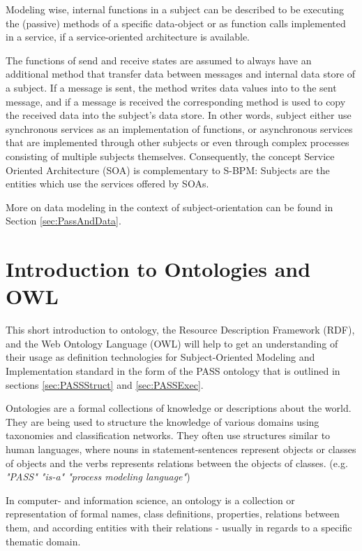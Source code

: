 Modeling wise, internal functions in a subject can be described to be executing the (passive) methods of a specific data-object or as function calls implemented in a service, if a service-oriented architecture is available.

The functions of send and receive states are assumed to always have an additional method that transfer data between messages and internal data store of a subject. If a message is sent, the method writes data values into to the sent message, and if a message is received the corresponding method is used to copy the received data into the subject's data store. In other words, subject either use synchronous services as an implementation of functions, or asynchronous services that are implemented through other subjects or even through complex processes consisting of multiple subjects themselves. Consequently, the concept Service Oriented Architecture (SOA) is complementary to S-BPM: Subjects are the entities which use the services offered by SOAs.

More on data modeling in the context of subject-orientation can be found in Section \ref{sec:PassAndData}.

\section{Introduction to Ontologies and OWL }
\label{IntroOntology}

This short introduction to ontology, the Resource Description Framework (RDF), and the Web Ontology Language (OWL) will help to get an understanding of their usage as definition technologies for Subject-Oriented Modeling and Implementation standard in the form of the PASS ontology that is outlined in sections \ref{sec:PASSStruct} and \ref{sec:PASSExec}.

Ontologies are a formal collections of knowledge or descriptions about the world. They are being used to structure the knowledge of  various domains using taxonomies and classification networks. They often use structures similar to human languages, where nouns in statement-sentences represent objects or classes of objects and the verbs represents relations between the objects of classes. (e.g. \textit{"PASS" "is-a" "process modeling language"})

In computer- and information science, an ontology is a collection or representation of formal names, class definitions, properties, relations between them, and according entities with their relations  - usually in regards to a specific thematic domain.


